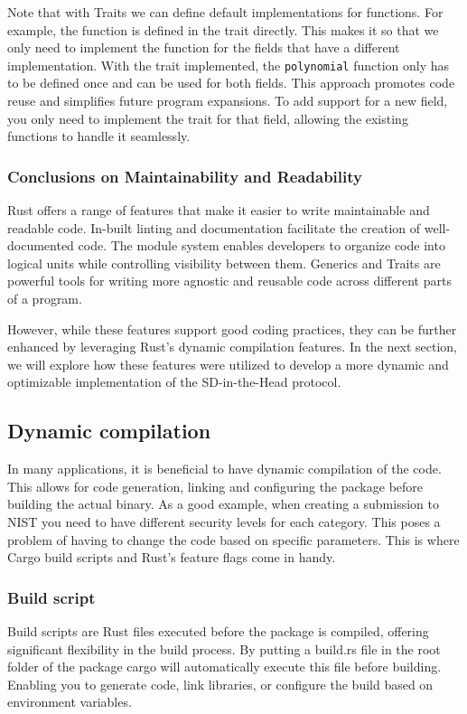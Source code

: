 \documentclass[11pt]{report}
\theoremstyle{definition}
\theoremstyle{plain}
\begin{document}
Note that with Traits we can define default implementations for functions. For example, the  function is defined in the trait directly. This makes it so that we only need to implement the function for the fields that have a different implementation. With the trait implemented, the \texttt{polynomial} function only has to be defined once and can be used for both fields. This approach promotes code reuse and simplifies future program expansions. To add support for a new field, you only need to implement the  trait for that field, allowing the existing functions to handle it seamlessly.

\subsubsection{Conclusions on Maintainability and Readability}
Rust offers a range of features that make it easier to write maintainable and readable code. In-built linting and documentation facilitate the creation of well-documented code. The module system enables developers to organize code into logical units while controlling visibility between them. Generics and Traits are powerful tools for writing more agnostic and reusable code across different parts of a program.

However, while these features support good coding practices, they can be further enhanced by leveraging Rust's dynamic compilation features. In the next section, we will explore how these features were utilized to develop a more dynamic and optimizable implementation of the SD-in-the-Head protocol.

\subsection{Dynamic compilation}
In many applications, it is beneficial to have dynamic compilation of the code. This allows for code generation, linking and configuring the package before building the actual binary. As a good example, when creating a submission to NIST you need to have different security levels for each category. This poses a problem of having to change the code based on specific parameters. This is where Cargo build scripts and Rust's feature flags come in handy.

\subsubsection{Build script}
Build scripts are Rust files executed before the package is compiled, offering significant flexibility in the build process. By putting a build.rs file in the root folder of the package cargo will automatically execute this file before building. Enabling you to generate code, link libraries, or configure the build based on environment variables.
\end{document}
